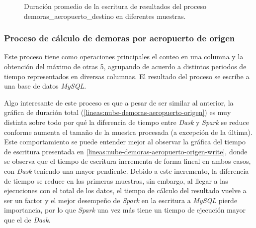 \begin{figure}
\centering
{}
\caption{Duración promedio de la escritura de resultados del proceso demoras\_aeropuerto\_destino en diferentes muestras.}
\label{lineas:nube-demoras-aeropuerto-destino-write}
\end{figure}

\subsubsection{Proceso de cálculo de demoras por aeropuerto de origen}

Este proceso tiene como operaciones principales el conteo en una columna y la obtención del máximo de otras 5, agrupando de acuerdo a distintos periodos de tiempo representados en diversas columnas. El resultado del proceso se escribe a una base de datos \textit{MySQL}.

Algo interesante de este proceso es que a pesar de ser similar al anterior, la gráfica de duración total (\ref{lineas:nube-demoras-aeropuerto-origen}) es muy distinta sobre todo por qué la diferencia de tiempo entre \textit{Dask} y \textit{Spark} se reduce conforme aumenta el tamaño de la muestra procesada (a excepción de la última). Este comportamiento se puede entender mejor al observar la gráfica del tiempo de escritura presentada en \ref{lineas:nube-demoras-aeropuerto-origen-write}, donde se observa que el tiempo de escritura incrementa de forma lineal en ambos casos, con \textit{Dask} teniendo una mayor pendiente. Debido a este incremento, la diferencia de tiempo se reduce en las primeras muestras, sin embargo, al llegar a las ejecuciones con el total de los datos, el tiempo de cálculo del resultado vuelve a ser un factor y el mejor desempeño de \textit{Spark} en la escritura a \textit{MySQL} pierde importancia, por lo que \textit{Spark} una vez más tiene un tiempo de ejecución mayor que el de \textit{Dask}. 


